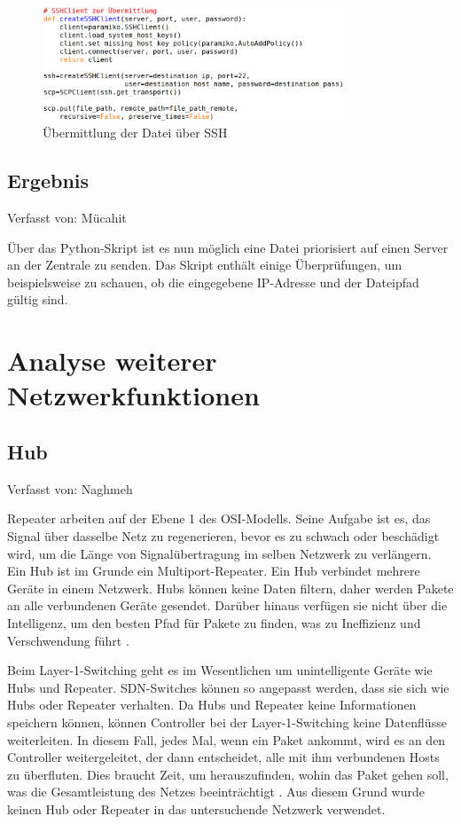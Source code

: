 \documentclass[fontsize=12pt,paper=a4,open=any,parskip=half,
  twoside=false,toc=listof,toc=bibliography,fleqn,leqno,
  captions=nooneline,captions=tableabove,british]{scrbook}
\begin{document}
\begin{figure}[H]
 \centering
 \includegraphics[width=0.8\textwidth]{Bilder/ssh}
 \captionsetup{justification=centering}
 \caption{Übermittlung der Datei über SSH}
 \label{ssh}
\end{figure}

\subsection{Ergebnis}
{\tiny Verfasst von: Mücahit\par}
Über das Python-Skript ist es nun möglich eine Datei priorisiert auf einen Server an der Zentrale zu senden. Das Skript enthält einige Überprüfungen, um beispielsweise zu schauen, ob die eingegebene IP-Adresse und der Dateipfad gültig sind.

\newpage
\section{Analyse weiterer Netzwerkfunktionen}

\subsection{Hub}
{\tiny Verfasst von: Naghmeh\par}
Repeater arbeiten auf der Ebene 1 des OSI-Modells. Seine Aufgabe ist es, das Signal über dasselbe Netz zu regenerieren, bevor es zu schwach oder beschädigt wird, um die Länge von Signalübertragung im selben Netzwerk zu verlängern. Ein Hub ist im Grunde ein Multiport-Repeater. Ein Hub verbindet mehrere Geräte in einem Netzwerk. Hubs können keine Daten filtern, daher werden Pakete an alle verbundenen Geräte gesendet. Darüber hinaus verfügen sie nicht über die Intelligenz, um den besten Pfad für Pakete zu finden, was zu Ineffizienz und Verschwendung führt \cite{networkdevices}.\par
Beim Layer-1-Switching geht es im Wesentlichen um unintelligente Geräte wie Hubs und Repeater. SDN-Switches können so angepasst werden, dass sie sich wie Hubs oder Repeater verhalten. Da Hubs und Repeater keine Informationen speichern können, können Controller bei der Layer-1-Switching keine Datenflüsse weiterleiten. In diesem Fall, jedes Mal, wenn ein Paket ankommt, wird es an den Controller weitergeleitet, der dann entscheidet, alle mit ihm verbundenen Hosts zu überfluten. Dies braucht Zeit, um herauszufinden, wohin das Paket gehen soll, was die Gesamtleistung des Netzes beeinträchtigt \cite{7840116}. Aus diesem Grund wurde keinen Hub oder Repeater in das untersuchende Netzwerk verwendet. 
\end{document}
